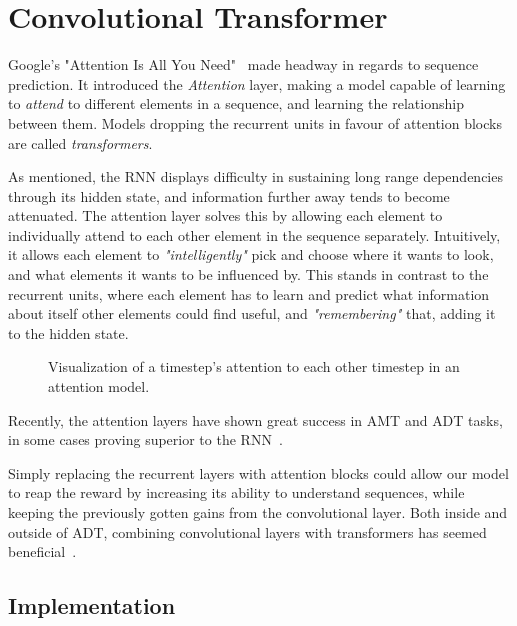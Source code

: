 \section{Convolutional Transformer}

Google's "Attention Is All You Need"~\cite{NIPS2017_3f5ee243} made headway in regards to sequence prediction. It introduced the \textit{Attention} layer, making a model capable of learning to \textit{attend} to different elements in a sequence, and learning the relationship between them. Models dropping the recurrent units in favour of attention blocks are called \textit{transformers}.

As mentioned, the \gls{RNN} displays difficulty in sustaining long range dependencies through its hidden state, and information further away tends to become attenuated. The attention layer solves this by allowing each element to individually attend to each other element in the sequence separately. Intuitively, it allows each element to \textit{"intelligently"} pick and choose where it wants to look, and what elements it wants to be influenced by. This stands in contrast to the recurrent units, where each element has to learn and predict what information about itself other elements could find useful, and \textit{"remembering"} that, adding it to the hidden state.

\begin{figure}[H]
    \centering
    
    \caption{Visualization of a timestep's attention to each other timestep in an attention model.}
    \label{CTInfluenceFigure}
\end{figure}


Recently, the attention layers have shown great success in \gls{AMT} and \gls{ADT} tasks, in some cases proving superior to the \gls{RNN}~\cite{gardner2022mt3multitaskmultitrackmusic, chang2024yourmt3+, zehren2024analyzingreducingsynthetictorealtransfer}.

Simply replacing the recurrent layers with attention blocks could allow our model to reap the reward by increasing its ability to understand sequences, while keeping the previously gotten gains from the convolutional layer. Both inside and outside of \gls{ADT}, combining convolutional layers with transformers has seemed beneficial~\cite{zehren2024analyzingreducingsynthetictorealtransfer, gulati2020conformerconvolutionaugmentedtransformerspeech}.

\subsection{Implementation}

